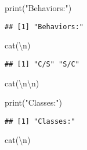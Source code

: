 \documentclass[
]{article}
\newenvironment{Shaded}{\begin{snugshade}}{\end{snugshade}}
\newcommand{\FunctionTok}[1]{\textcolor[rgb]{0.00,0.00,0.00}{#1}}
\newcommand{\NormalTok}[1]{#1}
\newcommand{\SpecialCharTok}[1]{\textcolor[rgb]{0.00,0.00,0.00}{#1}}
\newcommand{\StringTok}[1]{\textcolor[rgb]{0.31,0.60,0.02}{#1}}
\begin{document}
\begin{Shaded}
\begin{Highlighting}[]
\FunctionTok{print}\NormalTok{(}\StringTok{"Behaviors:"}\NormalTok{)}
\end{Highlighting}
\end{Shaded}

\begin{verbatim}
## [1] "Behaviors:"
\end{verbatim}

\begin{Shaded}
\begin{Highlighting}[]
\FunctionTok{cat}\NormalTok{(}\StringTok{\textquotesingle{}}\SpecialCharTok{\textbackslash{}n}\StringTok{\textquotesingle{}}\NormalTok{)}
\end{Highlighting}
\end{Shaded}

\begin{Shaded}
\end{Shaded}

\begin{verbatim}
## [1] "C/S" "S/C"
\end{verbatim}

\begin{Shaded}
\begin{Highlighting}[]
\FunctionTok{cat}\NormalTok{(}\StringTok{\textquotesingle{}}\SpecialCharTok{\textbackslash{}n\textbackslash{}n}\StringTok{\textquotesingle{}}\NormalTok{)}
\end{Highlighting}
\end{Shaded}

\begin{Shaded}
\begin{Highlighting}[]
\FunctionTok{print}\NormalTok{(}\StringTok{"Classes:"}\NormalTok{)}
\end{Highlighting}
\end{Shaded}

\begin{verbatim}
## [1] "Classes:"
\end{verbatim}

\begin{Shaded}
\begin{Highlighting}[]
\FunctionTok{cat}\NormalTok{(}\StringTok{\textquotesingle{}}\SpecialCharTok{\textbackslash{}n}\StringTok{\textquotesingle{}}\NormalTok{)}
\end{Highlighting}
\end{Shaded}
\end{document}
